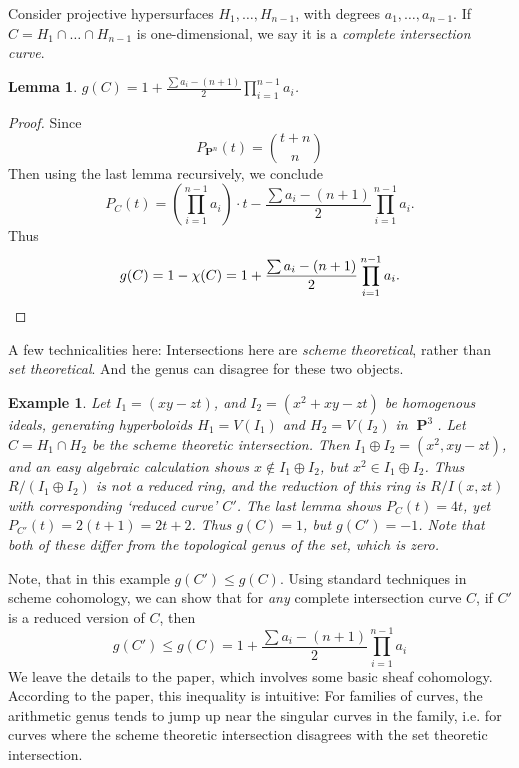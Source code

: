 \documentclass{article}
\theoremstyle{plain}
\newtheorem{lemma}[theorem]{Lemma}
\newtheorem*{example}{Example}
\DeclareMathOperator{\PP}{\mathbf{P}}
\begin{document}
Consider projective hypersurfaces $H_1, \dots, H_{n-1}$, with degrees $a_1, \dots, a_{n-1}$. If $C = H_1 \cap \dots \cap H_{n-1}$ is one-dimensional, we say it is a {\it complete intersection curve}.

\begin{lemma}
    $g(C) = 1 + \frac{\sum a_i - (n + 1)}{2} \prod_{i = 1}^{n-1} a_i$.
\end{lemma}
\begin{proof}
     Since
    \[ P_{\PP^n}(t) = {{t+n} \choose {n}} \]
    Then using the last lemma recursively, we conclude
    \[ P_C(t) = \left( \prod_{i = 1}^{n-1} a_i \right) \cdot t - \frac{\sum a_i - (n + 1)}{2} \prod_{i = 1}^{n-1} a_i. \]
    Thus
    \[ g(C) = 1 - \chi(C) = 1 + \frac{\sum a_i - (n + 1)}{2} \prod_{i = 1}^{n-1} a_i. \qedhere \]
\end{proof}

A few technicalities here: Intersections here are {\it scheme theoretical}, rather than {\it set theoretical}. And the genus can disagree for these two objects.

\begin{example}
    Let $I_1 = (xy-zt)$, and $I_2 = (x^2 + xy - zt)$ be homogenous ideals, generating hyperboloids $H_1 = V(I_1)$ and $H_2 = V(I_2)$ in $\PP^3$. Let $C = H_1 \cap H_2$ be the scheme theoretic intersection. Then $I_1 \oplus I_2 = (x^2, xy - zt)$, and an easy algebraic calculation shows $x \not \in I_1 \oplus I_2$, but $x^2 \in I_1 \oplus I_2$. Thus $R/(I_1 \oplus I_2)$ is not a reduced ring, and the reduction of this ring is $R/I(x,zt)$ with corresponding `reduced curve' $C'$. The last lemma shows $P_C(t) = 4t$, yet $P_{C'}(t) = 2(t+1) = 2t + 2$. Thus $g(C) = 1$, but $g(C') = -1$. Note that both of these differ from the topological genus of the set, which is zero.
\end{example}

 Note, that in this example $g(C') \leq g(C)$. Using standard techniques in scheme cohomology, we can show that for {\it any} complete intersection curve $C$, if $C'$ is a reduced version of $C$, then
 \[ g(C') \leq g(C) = 1 + \frac{\sum a_i - (n+1)}{2} \prod_{i = 1}^{n-1} a_i \]
 We leave the details to the paper, which involves some basic sheaf cohomology. According to the paper, this inequality is intuitive: For families of curves, the arithmetic genus tends to jump up near the singular curves in the family, i.e. for curves where the scheme theoretic intersection disagrees with the set theoretic intersection.
\end{document}
